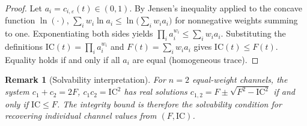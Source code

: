 \documentclass[
  aps,
  prd,
  preprint,
  superscriptaddress,
  nofootinbib,
  floatfix
]{revtex4-2}
\newcommand{\IC}{\mathrm{IC}}
\newtheorem{remark}{Remark}
\begin{document}
\begin{proof}
Let $a_i=c_{i,\varepsilon}(t)\in(0,1)$. By Jensen's inequality applied to the concave function $\ln(\cdot)$,
$\sum_i w_i \ln a_i \le \ln\!\bigl(\sum_i w_i a_i\bigr)$ for nonnegative weights summing to one.
Exponentiating both sides yields $\prod_i a_i^{w_i} \le \sum_i w_i a_i$.
Substituting the definitions $\IC(t)=\prod_i a_i^{w_i}$ and $F(t)=\sum_i w_i a_i$ gives $\IC(t)\le F(t)$.
Equality holds if and only if all $a_i$ are equal (homogeneous trace).
\end{proof}

\begin{remark}[Solvability interpretation]
For $n=2$ equal-weight channels, the system $c_1+c_2=2F$,\; $c_1 c_2=\IC^2$ has real solutions
$c_{1,2}=F\pm\sqrt{F^2-\IC^2}$ if and only if $\IC\le F$.
The integrity bound is therefore the \emph{solvability condition} for recovering individual channel values from $(F,\IC)$.
\end{remark}
\end{document}
